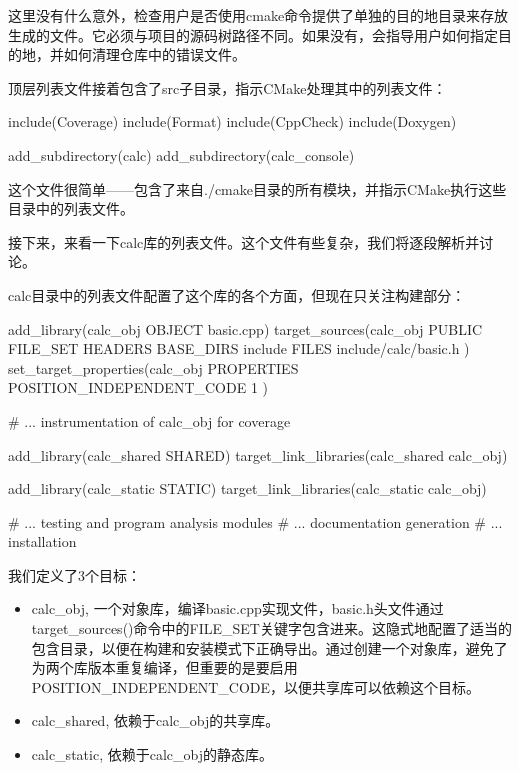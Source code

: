 这里没有什么意外，检查用户是否使用cmake命令提供了单独的目的地目录来存放生成的文件。它必须与项目的源码树路径不同。如果没有，会指导用户如何指定目的地，并如何清理仓库中的错误文件。

顶层列表文件接着包含了src子目录，指示CMake处理其中的列表文件：


\begin{cmake}
include(Coverage)
include(Format)
include(CppCheck)
include(Doxygen)

add_subdirectory(calc)
add_subdirectory(calc_console)
\end{cmake}

这个文件很简单——包含了来自./cmake目录的所有模块，并指示CMake执行这些目录中的列表文件。

接下来，来看一下calc库的列表文件。这个文件有些复杂，我们将逐段解析并讨论。


calc目录中的列表文件配置了这个库的各个方面，但现在只关注构建部分：


\begin{cmake}
add_library(calc_obj OBJECT basic.cpp)
target_sources(calc_obj
               PUBLIC FILE_SET HEADERS
               BASE_DIRS include
               FILES include/calc/basic.h
)
set_target_properties(calc_obj PROPERTIES
    POSITION_INDEPENDENT_CODE 1
)

# ... instrumentation of calc_obj for coverage

add_library(calc_shared SHARED)
target_link_libraries(calc_shared calc_obj)

add_library(calc_static STATIC)
target_link_libraries(calc_static calc_obj)

# ... testing and program analysis modules
# ... documentation generation
# ... installation
\end{cmake}

我们定义了3个目标：

\begin{itemize}
\item
calc\_obj, 一个对象库，编译basic.cpp实现文件，basic.h头文件通过target\_sources()命令中的FILE\_SET关键字包含进来。这隐式地配置了适当的包含目录，以便在构建和安装模式下正确导出。通过创建一个对象库，避免了为两个库版本重复编译，但重要的是要启用POSITION\_INDEPENDENT\_CODE，以便共享库可以依赖这个目标。

\item
calc\_shared, 依赖于calc\_obj的共享库。

\item
calc\_static, 依赖于calc\_obj的静态库。
\end{itemize}

